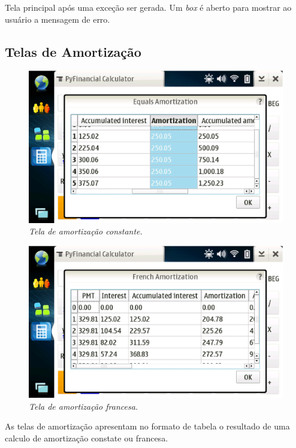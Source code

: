 Tela principal após uma exceção ser gerada. Um \textit{box} é aberto para mostrar ao usuário a
mensagem de erro.


\subsection{Telas de Amortização}

\begin{figure}[!h]
 \includegraphics[scale=0.55]{tela_cas.eps}
 \caption{\it Tela de amortização constante.} \label{tab:tela_cas}
\end{figure}

\begin{figure}[!h]
 \includegraphics[scale=0.55]{tela_fas.eps}
 \caption{\it Tela de amortização francesa.} \label{tab:tela_fas}
\end{figure}


As telas de amortização apresentam no formato de tabela o resultado de uma calculo de
amortização constate ou francesa.


